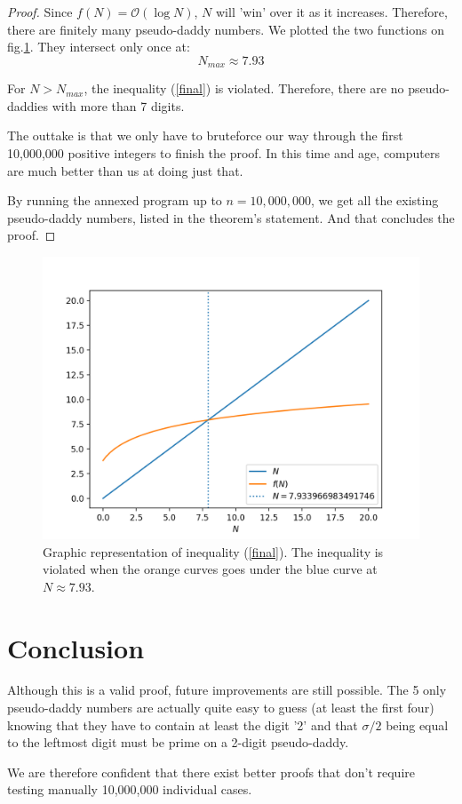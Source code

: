 \documentclass[a4paper, 11pt]{report}
\begin{document}
\begin{proof}
	Since $f(N) = \mathcal{O}(\log N)$, $N$ will 'win' over it as it increases. Therefore, there are finitely many pseudo-daddy numbers.
	We plotted the two functions on fig.\ref{plot}. They intersect only once at:
	$$N_{max}\approx7.93$$
	
	For $N> N_{max}$, the inequality (\ref{final}) is violated. Therefore, there are no pseudo-daddies with more than 7 digits.
	
	The outtake is that we only have to bruteforce our way through the first 10,000,000 positive integers to finish the proof. In this time and age, computers are much better than us at doing just that. 
	
	By running the annexed program up to $n=10,000,000$, we get all the existing pseudo-daddy numbers, listed in the theorem's statement. And that concludes the proof.
\end{proof}

\begin{figure}[htbp]
\begin{center}
	\includegraphics{plot.png}
\caption{Graphic representation of inequality (\ref{final}). The inequality is violated when the orange curves goes under the blue curve at $N\approx7.93$.}
\label{plot}
\end{center}
\end{figure}

\section{Conclusion}
	Although this is a valid proof, future improvements are still possible. The 5 only pseudo-daddy numbers are actually quite easy to guess (at least the first four) knowing that they have to contain at least the digit '2' and that $\sigma/2$ being equal to the leftmost digit must be prime on a 2-digit pseudo-daddy. 
	
	We are therefore confident that there exist better proofs that don't require testing manually 10,000,000 individual cases.

%
%
\end{document}
